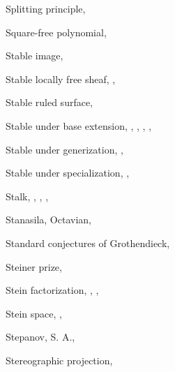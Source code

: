 {{\noindent\hspace*{0.0bp}Splitting principle, \par
\noindent\hspace*{0.0bp}Square-free polynomial, \par
\noindent\hspace*{0.0bp}Stable image, \par
\noindent\hspace*{0.0bp}Stable locally free sheaf, , \par
\noindent\hspace*{0.0bp}Stable ruled surface, \par
\noindent\hspace*{0.0bp}Stable under base extension, , , , ,\par
\noindent\hspace*{15.0bp}\par
\noindent\hspace*{0.0bp}Stable under generization, , \par
\noindent\hspace*{0.0bp}Stable under specialization, , \par
\noindent\hspace*{0.0bp}Stalk, , , , \par
\noindent\hspace*{0.0bp}Stanasila, Octavian, \par
\noindent\hspace*{0.0bp}Standard conjectures of Grothendieck, \par
\noindent\hspace*{0.0bp}Steiner prize, \par
\noindent\hspace*{0.0bp}Stein factorization, , , \par
\noindent\hspace*{0.0bp}Stein space, , \par
\noindent\hspace*{0.0bp}Stepanov, S. A., \par
\noindent\hspace*{0.0bp}Stereographic projection, \par
}}
